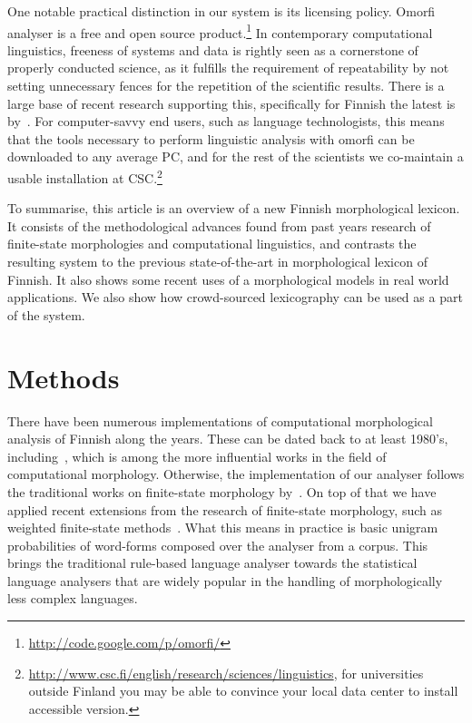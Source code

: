 \documentclass[a4paper,12pt]{article}
\begin{document}
One notable practical distinction in our system is its licensing policy. Omorfi
analyser is a free and open source product.\footnote{
\url{http://code.google.com/p/omorfi/}}  In contemporary computational
linguistics, freeness of systems and data is rightly seen as a cornerstone of
properly conducted science, as it fulfills the requirement of repeatability by
not setting unnecessary fences for the repetition of the scientific results.
There is a large base of recent research supporting this, specifically for
Finnish the latest is by~\citet{koskenniemi2008build}. For computer-savvy end
users, such as language technologists, this means that the tools necessary to
perform linguistic analysis with omorfi can be downloaded to any average PC,
and for the rest of the scientists we co-maintain a usable installation at
CSC.\footnote{\url{http://www.csc.fi/english/research/sciences/linguistics}, 
for universities outside Finland you may be able to convince your local data
center to install accessible version.}

To summarise, this article is an overview of a new Finnish morphological
lexicon.  It consists of the methodological advances found from past years
research of finite-state morphologies and computational linguistics, and
contrasts the resulting system to the previous state-of-the-art in
morphological lexicon of Finnish. It also shows some recent uses of a
morphological models in real world applications. We also show how
crowd-sourced lexicography can be used as a part of the system.

\section{Methods}
\label{sec:methods}

There have been numerous implementations of computational morphological
analysis of Finnish along the years. These  can be dated back to at least
1980's, including~\citet{koskenniemi1983twolevel}, which is among the more
influential works in the field of computational morphology.  Otherwise, the
implementation of our analyser follows the traditional works on finite-state
morphology by~\citet{beesley2003finite}. On top of that we have applied recent
extensions from the research of finite-state morphology, such as weighted
finite-state methods~\citep{openfst,hfst2012}. What this means in practice is
basic unigram probabilities of word-forms composed over the analyser from a
corpus.  This brings the traditional rule-based language analyser towards the
statistical language analysers that are widely popular in the handling of
morphologically less complex languages.
\end{document}
